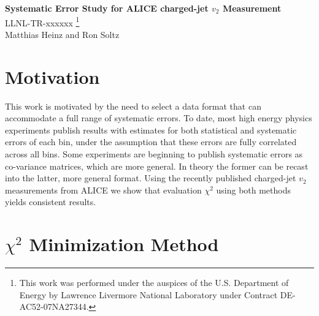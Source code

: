 \documentclass[11pt]{article}
\begin{document}
\renewcommand{\textfraction}{0.1}
\renewcommand{\topfraction}{0.9}
\renewcommand{\bottomfraction}{0.9}
\renewcommand{\floatpagefraction}{0.1}

\begin{center}
{\Large \bf Systematic Error Study for ALICE charged-jet $v_2$ Measurement}\\
\bigskip
LLNL-TR-xxxxxx
\footnote{This work was performed under the auspices of the U.S. Department of Energy by Lawrence Livermore National Laboratory under Contract DE-AC52-07NA27344.}
\\
\bigskip
Matthias Heinz and Ron Soltz
\end{center}

\begin{abstract}
We study the treatment of systematic errors in the determination of $v_2$ for charged jets in $\sqrt{s_{NN}}=2.76$~TeV Pb-Pb collisions by the ALICE Collaboration~\cite{Adam:2016ix}. Working with the reported values and errors for the 0-5\% centrality data we evaluate the $\chi^2$ according to the formulas given for the statistical and systematic errors, where the latter are separated into correlated and shape contributions. We reproduce both the $\chi^2$ and $p$-values relative to a null (zero) result. We then re-cast the systematic errors into an equivalent co-variance matrix and obtain identical results, demonstrating that the two methods are equivalent. 
\end{abstract}

\section{Motivation}

This work is motivated by the need to select a data format that can accommodate a full range of systematic errors. To date, most high energy physics experiments publish results with estimates for both statistical and systematic errors of each bin, under the assumption that these errors are fully correlated across all bins. Some experiments are beginning to publish systematic errors as co-variance matrices, which are more general. In theory the former can be recast into the latter, more general format. Using the recently published charged-jet $v_2$ measurements from ALICE we show that evaluation $\chi^2$ using both methods yields consistent results.

\section{$\chi^2$ Minimization Method}
\end{document}
